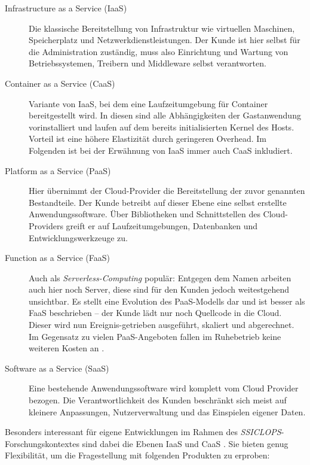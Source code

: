 \begin{description}
	
	\item[Infrastructure as a Service (IaaS)] Die klassische Bereitstellung von Infrastruktur wie virtuellen Maschinen, Speicherplatz und Netzwerkdienstleistungen. Der Kunde ist hier selbst für die Administration zuständig, muss also Einrichtung und Wartung von Betriebssystemen, Treibern und Middleware selbst verantworten.
	
	\item[Container as a Service (CaaS)] Variante von IaaS, bei dem eine Laufzeitumgebung für Container bereitgestellt wird. In diesen sind alle Abhängigkeiten der Gastanwendung vorinstalliert und laufen auf dem bereits initialisierten Kernel des Hosts. Vorteil ist eine höhere Elastizität durch geringeren Overhead. Im Folgenden ist bei der Erwähnung von IaaS immer auch CaaS inkludiert.
	
	\item[Platform as a Service (PaaS)] Hier übernimmt der Cloud-Provider die Bereitstellung der zuvor genannten Bestandteile. Der Kunde betreibt auf dieser Ebene eine selbst erstellte Anwendungssoftware. Über Bibliotheken und Schnittstellen des Cloud-Providers greift er auf Laufzeitumgebungen, Datenbanken und Entwicklungswerkzeuge zu.
	
	\item[Function as a Service (FaaS)] Auch als \emph{Serverless-Computing} populär: Entgegen dem Namen arbeiten auch hier noch Server, diese sind für den Kunden jedoch weitestgehend unsichtbar. Es stellt eine Evolution des PaaS-Modells dar und ist besser als FaaS beschrieben -- der Kunde lädt nur noch Quellcode in die Cloud. Dieser wird nun Ereignis-getrieben ausgeführt, skaliert und abgerechnet. Im Gegensatz zu vielen PaaS-Angeboten fallen im Ruhebetrieb keine weiteren Kosten an \cite{crisp:2016:serverless-infrastructure}.
	
	\item[Software as a Service (SaaS)] Eine bestehende Anwendungssoftware wird komplett vom Cloud Provider bezogen. Die Verantwortlichkeit des Kunden beschränkt sich meist auf kleinere Anpassungen, Nutzerverwaltung und das Einspielen eigener Daten.
	
\end{description}

\noindent
Besonders interessant für eigene Entwicklungen im Rahmen des \emph{SSICLOPS}-Forschungskontextes sind dabei die Ebenen IaaS und CaaS \cite{ssiclops:2015:d6.1-project-presentation}. Sie bieten genug Flexibilität, um die Fragestellung mit folgenden Produkten zu erproben:


